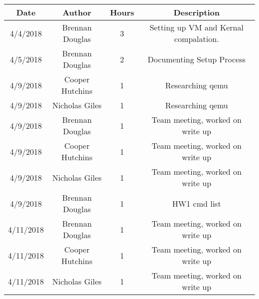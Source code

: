 \documentclass[onecolumn, draftclsnofoot,10pt, compsoc]{IEEEtran}
\begin{document}
\begin{center}
	\begin{tabular}{ |c|c|c|c| }
		\hline
		Date & Author & Hours & Description \\
		\hline
		4/4/2018 & Brennan Douglas & 3 & Setting up VM and Kernal compalation. \\\hline
        4/5/2018 & Brennan Douglas & 2 & Documenting Setup Process \\\hline
        4/9/2018 & Cooper Hutchins & 1 & Researching qemu \\\hline
        4/9/2018 & Nicholas Giles  & 1 & Researching qemu \\\hline
        4/9/2018 & Brennan Douglas & 1 & Team meeting, worked on write up \\\hline
        4/9/2018 & Cooper Hutchins & 1 & Team meeting, worked on write up \\\hline
        4/9/2018 & Nicholas Giles  & 1 & Team meeting, worked on write up \\\hline
        4/9/2018 & Brennan Douglas & 1 & HW1 cmd list \\\hline
        4/11/2018 & Brennan Douglas & 1 & Team meeting, worked on write up \\\hline
        4/11/2018 & Cooper Hutchins & 1 & Team meeting, worked on write up \\\hline
        4/11/2018 & Nicholas Giles  & 1 & Team meeting, worked on write up \\\hline
	\end{tabular}
\end{center}

%


\end{document}
